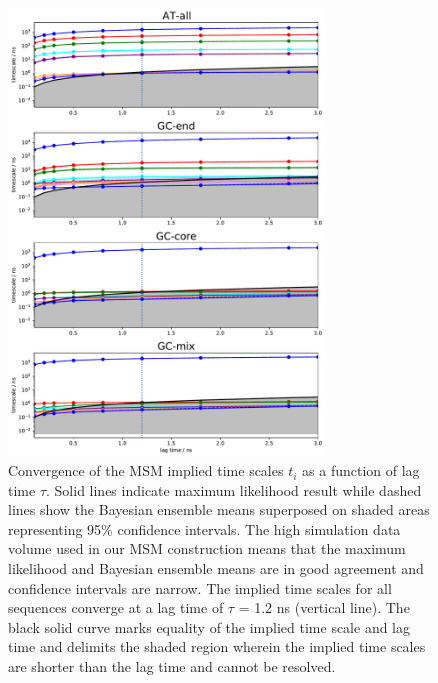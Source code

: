 \documentclass[journal=jpcbfk,manuscript=article]{achemso}
\begin{document}
\clearpage
\newpage

\begin{figure}[ht!]
	\centering
    \includegraphics[width=0.75\textwidth]{FigS2.pdf}
    \caption{Convergence of the MSM implied time scales $t_i$ as a function of lag time $\tau$. Solid lines indicate maximum likelihood result while dashed lines show the Bayesian ensemble means superposed on shaded areas representing 95\% confidence intervals. The high simulation data volume used in our MSM construction means that the maximum likelihood and Bayesian ensemble means are in good agreement and confidence intervals are narrow. The implied time scales for all sequences converge at a lag time of $\tau$ = 1.2 ns (vertical line). The black solid curve marks equality of the implied time scale and lag time and delimits the shaded region wherein the implied time scales are shorter than the lag time and cannot be resolved.}
    \label{fig:SIFig2}
\end{figure}

\clearpage
\newpage
\end{document}

